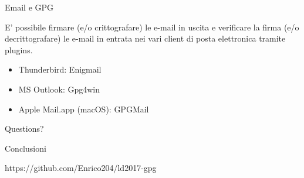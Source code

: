 \documentclass[10pt]{beamer}
\begin{document}
\begin{frame}[fragile]{Email e GPG}

E' possibile firmare (e/o crittografare) le e-mail in uscita e verificare la firma (e/o decrittografare) le e-mail in entrata nei vari client di posta elettronica tramite plugins.

\begin{itemize}
\item Thunderbird: Enigmail
\item MS Outlook: Gpg4win
\item Apple Mail.app (macOS): GPGMail
\end{itemize}

\end{frame}

\begin{frame}[standout]
  Questions?
\end{frame}

\begin{frame}{Conclusioni}

  \begin{center}\ccbysa\end{center}
  
  \centering https://github.com/Enrico204/ld2017-gpg

\end{frame}
\end{document}
